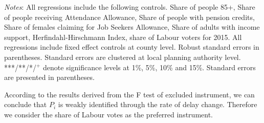 \documentclass[12pt,letterpaper]{article}
\begin{document}
\begin{table}[h]
\centering
\caption{First stage results, dependent variable house prices (log)}
\label{table first_stage}
\begin{tablenotes}
      \scriptsize
      \item {\it{Notes}}: All regressions include the following controls. Share of people 85+, 
      Share of people receiving Attendance Allowance, Share of people with pension credits, 
      Share of females claiming for Job Seekers Allowance, Share of adults with income 
      support, 
      Herfindahl-Hirschmann Index, share of Labour voters for 2015. All regressions include fixed effect controls at
      county level. Robust standard errors in parentheses. Standard errors are clustered at local planning 
      authority level. ***/**/*/$^{+}$ denote significance levels at 1\%, 5\%, 
      10\% and 15\%. Standard errors are presented in parentheses. 
    \end{tablenotes}
\end{table}

  According to the results derived from the F test of excluded instrument, we can conclude that $P_{i}$ 
  is weakly identified through the rate of delay change. Therefore we consider 
  the share of Labour votes as the preferred instrument. 
  
\end{document}
